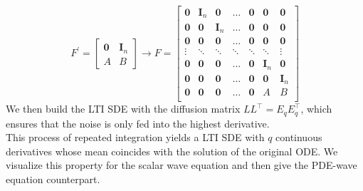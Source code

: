 $$F^\prime\!\! =\! \begin{bmatrix}
    \mathbf{0} & \textbf{I}_n \\ \!A & \!B
    \end{bmatrix} \to F = \begin{bmatrix}
\mathbf{0} & \textbf{I}_n & \mathbf{0} & \!\!\!\dots\!\! & \mathbf{0} & \mathbf{0} & \!\!\mathbf{0} \\
\mathbf{0} & \mathbf{0} & \textbf{I}_n & \!\!\!\dots\!\! & \mathbf{0} & \mathbf{0} & \!\!\mathbf{0} \\
\mathbf{0} & \mathbf{0} & \mathbf{0} & \!\!\!\dots\!\! & \mathbf{0} & \mathbf{0} & \!\!\mathbf{0} \\
\vdots & \!\!\ddots\!\! & \!\!\ddots\!\! & \!\!\ddots\!\! & \!\!\ddots\!\! & \!\!\ddots\!\! & \!\!\vdots \\
\mathbf{0} & \mathbf{0} & \mathbf{0} & \!\!\!\dots\!\! & \mathbf{0} & \textbf{I}_n & \!\!\mathbf{0} \\
\mathbf{0} & \mathbf{0} & \mathbf{0} & \!\!\!\dots\!\! & \mathbf{0} & \mathbf{0} & \textbf{I}_n \\
\mathbf{0} & \mathbf{0} & \mathbf{0} & \!\!\!\dots\!\! & \mathbf{0} & \!\!A & \!\!\!\!B \\
\end{bmatrix}$$
We then build the LTI SDE with the diffusion matrix $LL^\top = E_qE_q^\top$, which ensures that the noise is only fed into the highest derivative. \\
This process of repeated integration yields a LTI SDE with $q$ continuous derivatives whose mean coincides with the solution of the original ODE. We visualize this property for the scalar wave equation and then give the PDE-wave equation counterpart.
